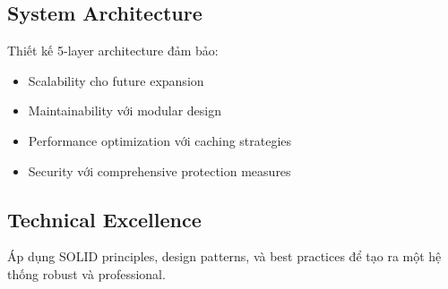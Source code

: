 \subsection{System Architecture}
Thiết kế 5-layer architecture đảm bảo:
\begin{itemize}
    \item Scalability cho future expansion
    \item Maintainability với modular design
    \item Performance optimization với caching strategies
    \item Security với comprehensive protection measures
\end{itemize}

\subsection{Technical Excellence}
Áp dụng SOLID principles, design patterns, và best practices để tạo ra một hệ thống robust và professional.


